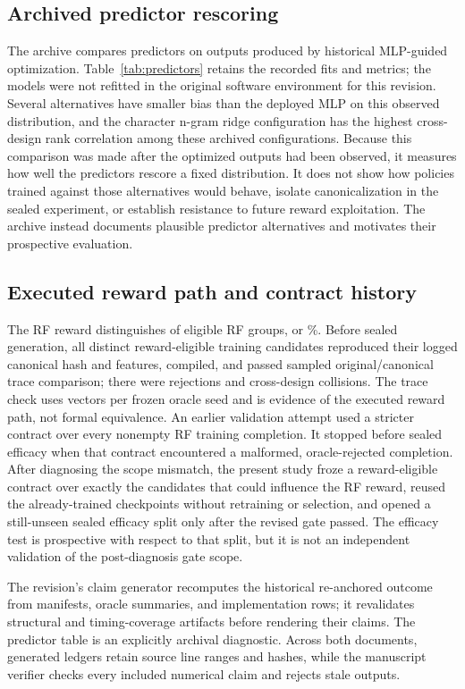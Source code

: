\subsection{Archived predictor rescoring}

The archive compares predictors on outputs produced by historical MLP-guided
optimization. Table~\ref{tab:predictors} retains the recorded fits and metrics;
the models were not refitted in the original software environment for this
revision. Several alternatives have smaller bias than the deployed MLP on
this observed distribution, and the character n-gram ridge configuration has
the highest cross-design rank correlation among these archived configurations.
Because this comparison was made after the optimized outputs had been
observed, it measures how well the predictors rescore a fixed distribution.
It does not show how policies trained against those alternatives would behave,
isolate canonicalization in the sealed experiment, or establish resistance to
future reward exploitation. The archive instead documents plausible predictor
alternatives and motivates their prospective evaluation.

\subsection{Executed reward path and contract history}
The RF reward distinguishes
 of
 eligible RF groups, or
\%.  Before sealed generation, all
 distinct reward-eligible training
candidates reproduced their logged canonical hash and features, compiled, and
passed sampled original/canonical trace comparison; there were
 rejections and
 cross-design collisions.  The trace
check uses  vectors per frozen oracle
seed and is evidence of the executed reward path, not formal equivalence.
An earlier validation attempt used a stricter contract over every nonempty RF
training completion.  It stopped before sealed efficacy when that contract
encountered a malformed, oracle-rejected completion.  After diagnosing the
scope mismatch, the present study froze a reward-eligible contract over exactly
the candidates that could influence the RF reward, reused the already-trained
checkpoints without retraining or selection, and opened a still-unseen sealed
efficacy split only after the revised gate passed.  The efficacy test is
prospective with respect to that split, but it is not an independent validation
of the post-diagnosis gate scope.

The revision's claim generator recomputes the historical re-anchored outcome
from manifests, oracle summaries, and implementation rows; it revalidates
structural and timing-coverage artifacts before rendering their claims. The
predictor table is an explicitly archival diagnostic. Across both documents,
generated ledgers retain source line ranges and hashes, while the manuscript
verifier checks every included numerical claim and rejects stale outputs.
